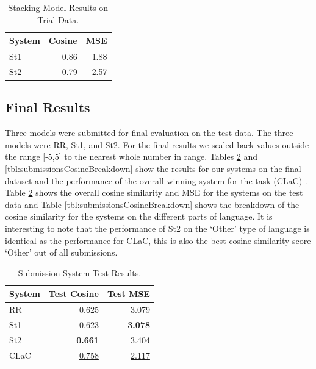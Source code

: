\documentclass[11pt,letterpaper]{article}
\begin{document}
\begin{table}[ht!]
\begin{center}
\begin{tabular}{|l|r|r|}
\hline
System & Cosine & MSE\\
\hline
{\sc St1} & 0.86 &1.88\\
{\sc St2} & 0.79 & 2.57\\
\hline
\end{tabular}
\end{center}
\caption{Stacking Model Results on Trial Data.}
\label{tbl:stackingResults}
\end{table}
 
\subsection{Final Results} 

Three models were submitted for final evaluation on the test data. The three models were {\sc RR}, {\sc St1}, and {\sc St2}. For the final results we scaled back values outside the range [-5,5] to the nearest whole number in range. 
Tables \ref{tbl:submissionsTest} and \ref{tbl:submissionsCosineBreakdown} show the results for our systems on the final dataset and the performance of the overall winning system for the task ({\sc CLaC}) . Table \ref{tbl:submissionsTest} shows the overall cosine similarity and MSE for the systems on the test data and Table \ref{tbl:submissionsCosineBreakdown} shows the breakdown of the cosine similarity for the systems on the different parts of language. It is interesting to note that the performance of {\sc St2} on the `Other' type of language is identical as the performance for {\sc CLaC}, this is also the best cosine similarity score `Other' out of all submissions.


\begin{table}[ht!]
\begin{center}
\begin{tabular}{| l |  r | r | }
\hline
System  & Test Cosine & Test MSE\\
\hline
{\sc RR}  & 0.625 & 3.079\\
{\sc St1}  & 0.623 &{\bf  3.078}\\
{\sc St2} &  {\bf  0.661} & 3.404 \\
\hline
\hline
{\sc CLaC} & \underline{0.758} & \underline{2.117}\\
\hline
\end{tabular}
\end{center}
\caption{Submission System Test Results.\protect\footnotemark}
\label{tbl:submissionsTest}
\end{table}
\end{document}
